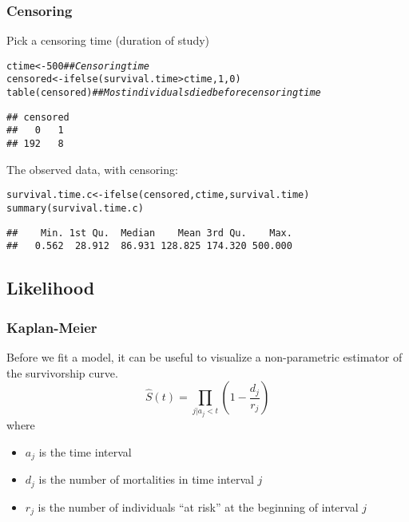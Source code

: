 \documentclass[color=usenames,dvipsnames]{beamer}\usepackage[]{graphicx}\usepackage[]{color}
\makeatletter
\newcommand{\hlnum}[1]{\textcolor[rgb]{0.69,0.494,0}{#1}}%
\newcommand{\hlcom}[1]{\textcolor[rgb]{0.514,0.506,0.514}{\textit{#1}}}%
\newcommand{\hlopt}[1]{\textcolor[rgb]{0,0,0}{#1}}%
\newcommand{\hlstd}[1]{\textcolor[rgb]{0,0,0}{#1}}%
\newcommand{\hlkwb}[1]{\textcolor[rgb]{0,0.341,0.682}{#1}}%
\newcommand{\hlkwd}[1]{\textcolor[rgb]{0.004,0.004,0.506}{#1}}%
\newenvironment{kframe}{%
 \def\at@end@of@kframe{}%
 \ifinner\ifhmode%
  \def\at@end@of@kframe{\end{minipage}}%
  \begin{minipage}{\columnwidth}%
 \fi\fi%
 \def\FrameCommand##1{\hskip\@totalleftmargin \hskip-\fboxsep
 \colorbox{shadecolor}{##1}\hskip-\fboxsep
     \hskip-\linewidth \hskip-\@totalleftmargin \hskip\columnwidth}%
 \MakeFramed {\advance\hsize-\width
   \@totalleftmargin\z@ \linewidth\hsize
   \@setminipage}}%
 {\par\unskip\endMakeFramed%
 \at@end@of@kframe}
\newenvironment{knitrout}{}{} %
\makeatother
\begin{document}
\begin{frame}[fragile]
  \frametitle{Censoring}
  Pick a censoring time (duration of study)
\begin{knitrout}\footnotesize
{}\color{fgcolor}\begin{kframe}
\begin{alltt}
\hlstd{ctime} \hlkwb{<-} \hlnum{500}    \hlcom{## Censoring time}
\hlstd{censored} \hlkwb{<-} \hlkwd{ifelse}\hlstd{(survival.time}\hlopt{>}\hlstd{ctime,} \hlnum{1}\hlstd{,} \hlnum{0}\hlstd{)}
\hlkwd{table}\hlstd{(censored)} \hlcom{## Most individuals died before censoring time}
\end{alltt}
\begin{verbatim}
## censored
##   0   1 
## 192   8
\end{verbatim}
\end{kframe}
\end{knitrout}
\pause
\vfill
The observed data, with censoring:
\begin{knitrout}\footnotesize
{}\color{fgcolor}\begin{kframe}
\begin{alltt}
\hlstd{survival.time.c} \hlkwb{<-} \hlkwd{ifelse}\hlstd{(censored, ctime, survival.time)}
\hlkwd{summary}\hlstd{(survival.time.c)}
\end{alltt}
\begin{verbatim}
##    Min. 1st Qu.  Median    Mean 3rd Qu.    Max. 
##   0.562  28.912  86.931 128.825 174.320 500.000
\end{verbatim}
\end{kframe}
\end{knitrout}
  
\end{frame}






\subsection{Likelihood}





\begin{frame}[fragile]
  \frametitle{Kaplan-Meier}
  Before we fit a model, it can be useful to visualize a
  non-parametric estimator of the survivorship curve. \\
  \pause
  \vfill
  \[
    \hat{S}(t) = \prod_{j|a_j < t} \left(1 - \frac{d_j}{r_j}\right)
  \]
  where
  \begin{itemize}
    \item $a_j$ is the time interval
    \item $d_j$ is the number of mortalities in time interval $j$
    \item $r_j$ is the number of individuals ``at risk'' at the
      beginning of interval $j$
  \end{itemize}
\end{frame}
\end{document}
